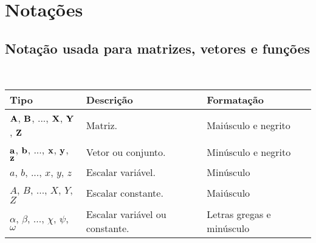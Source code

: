 
\chapter{Notações}

\section{Notação usada para matrizes, vetores e funções}
\begin{notation}~\\
\begin{tabular}{p{} | p{} | p{} }
\hline	
Tipo & Descrição & Formatação \\ \hline
$\MATRIX{A}$, $\MATRIX{B}$, ..., $\MATRIX{X}$, $\MATRIX{Y}$, $\MATRIX{Z}$& Matriz. & Maiúsculo e negrito \\
$\VECTOR{a}$, $\VECTOR{b}$, ..., $\VECTOR{x}$, $\VECTOR{y}$, $\VECTOR{z}$ & Vetor ou conjunto. & Minúsculo e negrito \\
$a$, $b$, ..., $x$, $y$, $z$ & Escalar variável. & Minúsculo \\
$A$, $B$, ..., $X$, $Y$, $Z$ & Escalar constante. & Maiúsculo \\
$\alpha$, $\beta$, ..., $\chi$, $\psi$, $\omega$ & Escalar variável ou constante. & Letras gregas e minúsculo  \\ \hline
\end{tabular}
\end{notation}


